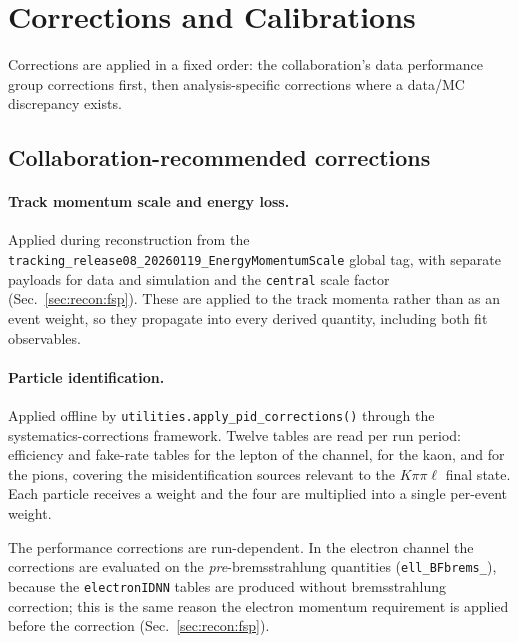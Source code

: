 \section{Corrections and Calibrations}
\label{sec:corrections}

Corrections are applied in a fixed order: the collaboration's data performance group
corrections first, then analysis-specific corrections where a
data/MC discrepancy exists.

\subsection{Collaboration-recommended corrections}
\label{sec:corrections:recommended}

\paragraph{Track momentum scale and energy loss.}
Applied during reconstruction from the
\texttt{tracking\_release08\_20260119\_EnergyMomentumScale} global tag, with
separate payloads for data and simulation and the \texttt{central} scale
factor (Sec.~\ref{sec:recon:fsp}).
These are applied to the track momenta rather than as an event weight, so
they propagate into every derived quantity, including both fit observables.

\paragraph{Particle identification.}
Applied offline by \texttt{utilities.apply\_pid\_corrections()} through the
systematics-corrections framework.
Twelve tables are read per run period: efficiency and fake-rate tables for the
lepton of the channel, for the kaon, and for the pions, covering the
misidentification sources relevant to the $K\pi\pi\ell$ final state.
Each particle receives a weight and the four are multiplied into a single
per-event weight.

The performance corrections are run-dependent.
In the electron channel the corrections are evaluated on the \emph{pre}-bremsstrahlung
quantities (\texttt{ell\_BFbrems\_}), because the 
\texttt{electronIDNN} tables are produced without bremsstrahlung correction; this is the
same reason the electron momentum requirement is applied before the correction
(Sec.~\ref{sec:recon:fsp}).


